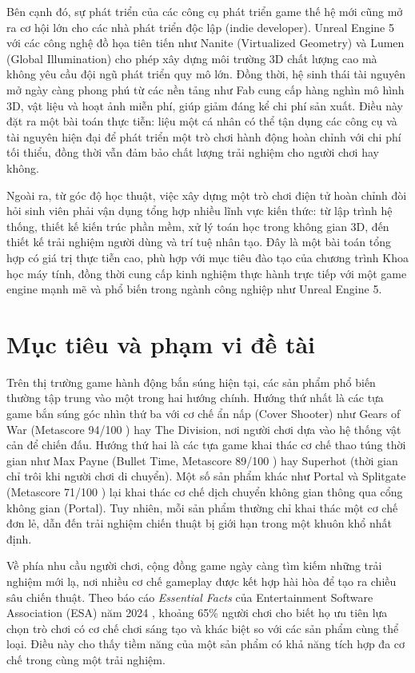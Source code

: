 \documentclass[../DoAn.tex]{subfiles}
\begin{document}
Bên cạnh đó, sự phát triển của các công cụ phát triển game thế hệ mới cũng mở ra cơ hội lớn cho các nhà phát triển độc lập (indie developer). Unreal Engine 5 với các công nghệ đồ họa tiên tiến như Nanite (Virtualized Geometry) và Lumen (Global Illumination) cho phép xây dựng môi trường 3D chất lượng cao mà không yêu cầu đội ngũ phát triển quy mô lớn. Đồng thời, hệ sinh thái tài nguyên mở ngày càng phong phú từ các nền tảng như Fab cung cấp hàng nghìn mô hình 3D, vật liệu và hoạt ảnh miễn phí, giúp giảm đáng kể chi phí sản xuất. Điều này đặt ra một bài toán thực tiễn: liệu một cá nhân có thể tận dụng các công cụ và tài nguyên hiện đại để phát triển một trò chơi hành động hoàn chỉnh với chi phí tối thiểu, đồng thời vẫn đảm bảo chất lượng trải nghiệm cho người chơi hay không.

Ngoài ra, từ góc độ học thuật, việc xây dựng một trò chơi điện tử hoàn chỉnh đòi hỏi sinh viên phải vận dụng tổng hợp nhiều lĩnh vực kiến thức: từ lập trình hệ thống, thiết kế kiến trúc phần mềm, xử lý toán học trong không gian 3D, đến thiết kế trải nghiệm người dùng và trí tuệ nhân tạo. Đây là một bài toán tổng hợp có giá trị thực tiễn cao, phù hợp với mục tiêu đào tạo của chương trình Khoa học máy tính, đồng thời cung cấp kinh nghiệm thực hành trực tiếp với một game engine mạnh mẽ và phổ biến trong ngành công nghiệp như Unreal Engine 5.

\section{Mục tiêu và phạm vi đề tài}
\label{section:1.2}

Trên thị trường game hành động bắn súng hiện tại, các sản phẩm phổ biến thường tập trung vào một trong hai hướng chính. Hướng thứ nhất là các tựa game bắn súng góc nhìn thứ ba với cơ chế ẩn nấp (Cover Shooter) như Gears of War (Metascore 94/100 \cite{MetacriticGearsOfWar}) hay The Division, nơi người chơi dựa vào hệ thống vật cản để chiến đấu. Hướng thứ hai là các tựa game khai thác cơ chế thao túng thời gian như Max Payne (Bullet Time, Metascore 89/100 \cite{MetacriticMaxPayne}) hay Superhot (thời gian chỉ trôi khi người chơi di chuyển). Một số sản phẩm khác như Portal và Splitgate (Metascore 71/100 \cite{MetacriticSplitgate}) lại khai thác cơ chế dịch chuyển không gian thông qua cổng không gian (Portal). Tuy nhiên, mỗi sản phẩm thường chỉ khai thác một cơ chế đơn lẻ, dẫn đến trải nghiệm chiến thuật bị giới hạn trong một khuôn khổ nhất định.

Về phía nhu cầu người chơi, cộng đồng game ngày càng tìm kiếm những trải nghiệm mới lạ, nơi nhiều cơ chế gameplay được kết hợp hài hòa để tạo ra chiều sâu chiến thuật. Theo báo cáo \textit{Essential Facts} của Entertainment Software Association (ESA) năm 2024 \cite{ESA2024}, khoảng 65\% người chơi cho biết họ ưu tiên lựa chọn trò chơi có cơ chế chơi sáng tạo và khác biệt so với các sản phẩm cùng thể loại. Điều này cho thấy tiềm năng của một sản phẩm có khả năng tích hợp đa cơ chế trong cùng một trải nghiệm.
\end{document}
